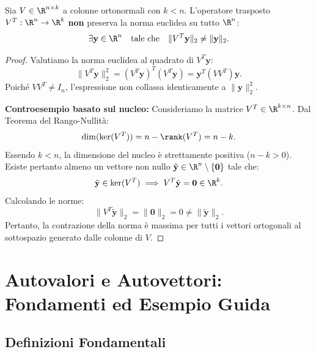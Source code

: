 \begin{proposition}
\label{prop:non-isometria-sinistra}
Sia $V \in \R^{n \times k}$ a colonne ortonormali con $k < n$. L'operatore trasposto $V^T: \R^n \to \R^k$ \textbf{non} preserva la norma euclidea su tutto $\R^n$:
\begin{equation}
    \exists \mathbf{y} \in \R^n \quad \text{tale che} \quad \|V^T \mathbf{y}\|_2 \neq \|\mathbf{y}\|_2.
\end{equation}
\end{proposition}

\begin{proof}
Valutiamo la norma euclidea al quadrato di $V^T \mathbf{y}$:
\begin{equation}
    \|V^T \mathbf{y}\|_2^2 = (V^T \mathbf{y})^T (V^T \mathbf{y}) = \mathbf{y}^T (V V^T) \mathbf{y}.
\end{equation}
Poich\'e $V V^T \neq I_n$, l'espressione non collassa identicamente a $\|\mathbf{y}\|_2^2$.

\medskip
\noindent\textbf{Controesempio basato sul nucleo:}
Consideriamo la matrice $V^T \in \R^{k \times n}$. Dal Teorema del Rango-Nullit\`a:
\begin{equation}
    \dim(\ker(V^T)) = n - \rank(V^T) = n - k.
\end{equation}
Essendo $k < n$, la dimensione del nucleo \`e strettamente positiva ($n - k > 0$). Esiste pertanto almeno un vettore non nullo $\tilde{\mathbf{y}} \in \R^n \setminus \{\mathbf{0}\}$ tale che:
\begin{equation}
    \tilde{\mathbf{y}} \in \ker(V^T) \implies V^T \tilde{\mathbf{y}} = \mathbf{0} \in \R^k.
\end{equation}
Calcolando le norme:
\begin{equation}
    \|V^T \tilde{\mathbf{y}}\|_2 = \|\mathbf{0}\|_2 = 0 \neq \|\tilde{\mathbf{y}}\|_2.
\end{equation}
Pertanto, la contrazione della norma \`e massima per tutti i vettori ortogonali al sottospazio generato dalle colonne di $V$.
\end{proof}

\FloatBarrier
\section{Autovalori e Autovettori: Fondamenti ed Esempio Guida}

\subsection{Definizioni Fondamentali}

